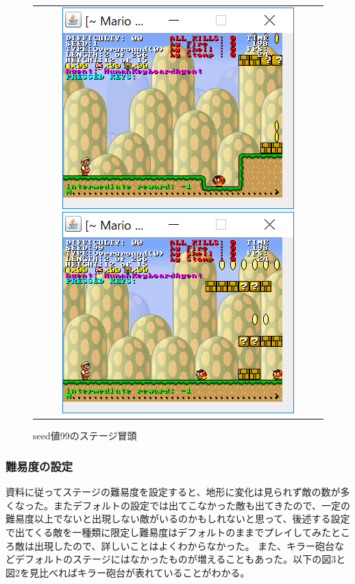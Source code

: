 \documentclass{jsarticle}
\begin{document}
\begin{figure}[H]
	\begin{tabular}{c}
	\begin{minipage}{0.50\hsize}
		\includegraphics{seed1.png}
		\caption{seed値1のステージ冒頭}
	\end{minipage}
	\begin{minipage}{0.50\hsize}
		\includegraphics{seed99.png}
		\caption{seed値99のステージ冒頭}
	\end{minipage}
	\end{tabular}
\end{figure}

\subsubsection{難易度の設定}
資料に従ってステージの難易度を設定すると、地形に変化は見られず敵の数が多くなった。またデフォルトの設定では出てこなかった敵も出てきたので、一定の難易度以上でないと出現しない敵がいるのかもしれないと思って、後述する設定で出てくる敵を一種類に限定し難易度はデフォルトのままでプレイしてみたところ敵は出現したので、詳しいことはよくわからなかった。
また、キラー砲台などデフォルトのステージにはなかったものが増えることもあった。以下の図3と図2を見比べればキラー砲台が表れていることがわかる。
\end{document}
